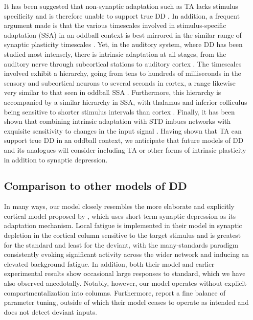 \documentclass[9pt,lineno,onehalfspacing]{elife}
\begin{document}
It has been suggested that non-synaptic adaptation such as TA lacks stimulus specificity and is therefore unable to support true DD \citep{Duque2015-eu, Yarden2017-eh}. In addition, a frequent argument made is that the various timescales involved in stimulus-specific adaptation (SSA) in an oddball context \citep{Ulanovsky2004-nf} is best mirrored in the similar range of synaptic plasticity timescales \citep{Tsodyks1997-qt, Varela1997-nr}. Yet, in the auditory system, where DD has been studied most intensely, there is intrinsic adaptation at all stages, from the auditory nerve \citep{Yates1983-uu, Westerman1984-ge} through subcortical stations \citep{Ingham2004-wc} to auditory cortex \citep{Abolafia2011-ig}. The timescales involved exhibit a hierarchy, going from tens to hundreds of milliseconds in the sensory and subcortical neurons to several seconds in cortex, a range likewise very similar to that seen in oddball SSA \citep{Ulanovsky2004-nf}. Furthermore, this hierarchy is accompanied by a similar hierarchy in SSA, with thalamus and inferior colliculus being sensitive to shorter stimulus intervals than cortex \citep{Perez-Gonzalez2014-pm}. Finally, it has been shown that combining intrinsic adaptation with STD imbues networks with exquisite sensitivity to changes in the input signal \citep{Puccini2006-tm}. Having shown that TA can support true DD in an oddball context, we anticipate that future models of DD and its analogues will consider including TA or other forms of intrinsic plasticity in addition to synaptic depression.

\subsection{Comparison to other models of DD}

In many ways, our model closely resembles the more elaborate and explicitly cortical model proposed by \cite{Yarden2017-eh}, which uses short-term synaptic depression as its adaptation mechanism. Local fatigue is implemented in their model in synaptic depletion in the cortical column sensitive to the target stimulus and is greatest for the standard and least for the deviant, with the many-standards paradigm consistently evoking significant activity across the wider network and inducing an elevated background fatigue. In addition, both their model and earlier experimental results \citep{Hershenhoren2014-bb} show occasional large responses to standard, which we have also observed anecdotally. Notably, however, our model operates without explicit compartmentalization into columns. Furthermore, \cite{Yarden2017-eh} report a fine balance of parameter tuning, outside of which their model ceases to operate as intended and does not detect deviant inputs.
\end{document}
